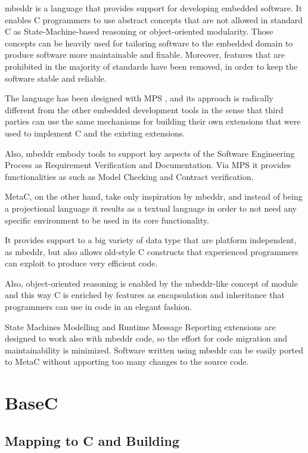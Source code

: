 \documentclass[a4paper,10pt,titlepage]{report}
\begin{document}
mbeddr is a language that provides support for developing embedded software. It enables C programmers to use abstract concepts that are not allowed in standard C as State-Machine-based reasoning or object-oriented modularity. Those concepts can be heavily used for tailoring software to the embedded domain to produce software more maintainable and fixable. Moreover, features that are prohibited in the majority of standards have been removed, in order to keep the software stable and reliable.

The language has been designed with MPS \cite{voelter2010language}, and its approach is radically different from the other embedded development tools in the sense that third parties can use the same mechanisms for building their own extensions that were used to implement C and the existing extensions. 

Also, mbeddr embody tools to support key aspects of the Software Engineering Process as Requirement Verification and Documentation. Via MPS it provides functionalities as such as Model Checking and Contract verification.

MetaC, on the other hand, take only inspiration by mbeddr, and instead of being a projectional language it results as a textual language in order to not need any specific environment to be used in its core functionality. 

It provides support to a big variety of data type that are platform independent, as mbeddr, but also allows old-style C constructs that experienced programmers can exploit to produce very efficient code.

Also, object-oriented reasoning is enabled by the mbeddr-like concept of module and this way C is enriched by features as encapsulation and inheritance that programmers can use in code in an elegant fashion.

State Machines Modelling and Runtime Message Reporting extensions are designed to work also with mbeddr code, so the effort for code migration and maintainability is minimized. Software written using mbeddr can be easily ported to MetaC without apporting too many changes to the source code.


\chapter{BaseC}
\section{Mapping to C and Building}
\end{document}
